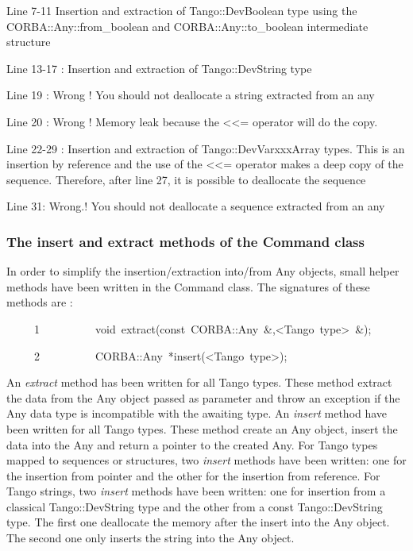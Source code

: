 Line 7-11 Insertion and extraction of Tango::DevBoolean type using
the CORBA::Any::from\_boolean and CORBA::Any::to\_boolean intermediate
structure

Line 13-17 : Insertion and extraction of Tango::DevString type

Line 19 : Wrong ! You should not deallocate a string extracted from
an any

Line 20 : Wrong ! Memory leak because the <\textcompwordmark{}<= operator
will do the copy. 

Line 22-29 : Insertion and extraction of Tango::DevVarxxxArray types.
This is an insertion by reference and the use of the <\textcompwordmark{}<=
operator makes a deep copy of the sequence. Therefore, after line
27, it is possible to deallocate the sequence

Line 31: Wrong.! You should not deallocate a sequence extracted from
an any

\subsubsection{The insert and extract methods of the Command class}

In order to simplify the insertion/extraction into/from Any
objects, small helper methods have been written in the Command
class. The signatures of these methods are :


\begin{lyxcode}
~~~~~1~~~~~~~~~~void~extract(const~CORBA::Any~\&,<Tango~type>~\&);

~~~~~2~~~~~~~~~~CORBA::Any~{*}insert(<Tango~type>);
\end{lyxcode}


An \emph{extract} method has been written for all Tango types. These
method extract the data from the Any object passed as parameter and
throw an exception if the Any data type is incompatible with the awaiting
type. An \emph{insert} method have been written for all Tango types.
These method create an Any object, insert the data into the Any and
return a pointer to the created Any. For Tango types mapped to sequences
or structures, two \emph{insert} methods have been written: one for
the insertion from pointer and the other for the insertion from reference.
For Tango strings, two \emph{insert} methods have been written: one
for insertion from a classical Tango::DevString type and the other
from a const Tango::DevString type. The first one deallocate the memory
after the insert into the Any object. The second one only inserts
the string into the Any object. 

